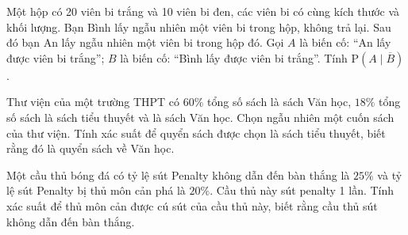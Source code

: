 \begin{bt}%
	Một hộp có 20 viên bi trắng và 10 viên bi đen, các viên bi có cùng kích thước và khối lượng. Bạn Bình lấy ngẫu nhiên một viên bi trong hộp, không trả lại. Sau đó bạn An lấy ngẫu nhiên một viên bi trong hộp đó. Gọi $A$ là biến cố: “An lấy được viên bi trắng”; $B$ là biến cố: “Bình lấy được viên bi trắng”. Tính  $\mathrm{P}\left(A\mid \overline{B} \right)$.
\end{bt}

\begin{bt}%
	Thư viện của một trường THPT có $60\%$ tổng số sách là sách  Văn học, $18\%$ tổng số sách là sách tiểu thuyết và là sách Văn học. Chọn ngẫu nhiên một cuốn sách của thư viện. Tính xác suất để quyển sách được chọn là sách tiểu thuyết, biết rằng đó là quyển sách về Văn học.
\end{bt}

\begin{bt}%
	 Một cầu thủ bóng đá có tỷ lệ sút Penalty không dẫn đến bàn thắng là $25\%$ và tỷ lệ sút Penalty bị thủ môn cản phá là $20\%$. Cầu thủ này sút penalty 1 lần. Tính xác suất để thủ môn cản được cú sút của cầu thủ này, biết rằng cầu thủ sút không dẫn đến bàn thắng.
\end{bt}

